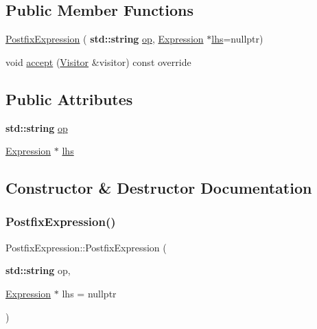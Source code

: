 \subsection*{Public Member Functions}
\begin{DoxyCompactItemize}
\item 
\hyperlink{struct_postfix_expression_a51cc535ac4af99bef2f292fb1ead6ad7}{Postfix\+Expression} (\textbf{ std\+::string} \hyperlink{struct_postfix_expression_a9ce1fb591d6787626d2eda8a9ca0a3cd}{op}, \hyperlink{struct_expression}{Expression} $\ast$\hyperlink{struct_postfix_expression_a33a5946e6ded6300ea8552325f22cba9}{lhs}=nullptr)
\item 
void \hyperlink{struct_postfix_expression_a2d814c990b7d1fb728f030a2673fe729}{accept} (\hyperlink{struct_visitor}{Visitor} \&visitor) const override
\end{DoxyCompactItemize}
\subsection*{Public Attributes}
\begin{DoxyCompactItemize}
\item 
\textbf{ std\+::string} \hyperlink{struct_postfix_expression_a9ce1fb591d6787626d2eda8a9ca0a3cd}{op}
\item 
\hyperlink{struct_expression}{Expression} $\ast$ \hyperlink{struct_postfix_expression_a33a5946e6ded6300ea8552325f22cba9}{lhs}
\end{DoxyCompactItemize}


\subsection{Constructor \& Destructor Documentation}
\mbox{\label{struct_postfix_expression_a51cc535ac4af99bef2f292fb1ead6ad7}} 
\subsubsection{\texorpdfstring{Postfix\+Expression()}{PostfixExpression()}}
{\footnotesize\ttfamily Postfix\+Expression\+::\+Postfix\+Expression (\begin{DoxyParamCaption}\item[{\textbf{ std\+::string}}]{op,  }\item[{\hyperlink{struct_expression}{Expression} $\ast$}]{lhs = {\ttfamily nullptr} }\end{DoxyParamCaption})\hspace{0.3cm}{\ttfamily [inline]}}




